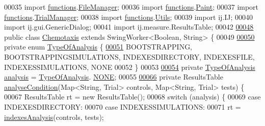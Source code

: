 \begin{DoxyCode}
00035 \textcolor{keyword}{import} \hyperlink{namespacefunctions}{functions}.\hyperlink{classfunctions_1_1_file_manager}{FileManager};
00036 \textcolor{keyword}{import} \hyperlink{namespacefunctions}{functions}.\hyperlink{classfunctions_1_1_paint}{Paint};
00037 \textcolor{keyword}{import} \hyperlink{namespacefunctions}{functions}.\hyperlink{classfunctions_1_1_trial_manager}{TrialManager};
00038 \textcolor{keyword}{import} \hyperlink{namespacefunctions}{functions}.\hyperlink{classfunctions_1_1_utils}{Utils};
00039 \textcolor{keyword}{import} ij.IJ;
00040 \textcolor{keyword}{import} ij.gui.GenericDialog;
00041 \textcolor{keyword}{import} ij.measure.ResultsTable;
00042 
\hypertarget{_chemotaxis_8java_source_l00048}{}\hyperlink{classanalysis_1_1_chemotaxis}{00048} \textcolor{keyword}{public} \textcolor{keyword}{class }\hyperlink{classanalysis_1_1_chemotaxis}{Chemotaxis} \textcolor{keyword}{extends} SwingWorker<Boolean, String> \{
00049 
\hypertarget{_chemotaxis_8java_source_l00050}{}\hyperlink{enumanalysis_1_1_chemotaxis_1_1_type_of_analysis}{00050}   \textcolor{keyword}{private} \textcolor{keyword}{enum} \hyperlink{enumanalysis_1_1_chemotaxis_1_1_type_of_analysis}{TypeOfAnalysis} \{
\hypertarget{_chemotaxis_8java_source_l00051}{}\hyperlink{enumanalysis_1_1_chemotaxis_1_1_type_of_analysis_a899caa602e4fff675b17cdbab33607ec}{00051}     BOOTSTRAPPING, BOOTSTRAPPINGSIMULATIONS, INDEXESDIRECTORY, INDEXESFILE, INDEXESSIMULATIONS, NONE
00052   \}
00053 
\hypertarget{_chemotaxis_8java_source_l00054}{}\hyperlink{classanalysis_1_1_chemotaxis_ae0c6f15cfb3c589fb7817738e51998bd}{00054}   \textcolor{keyword}{private} \hyperlink{enumanalysis_1_1_chemotaxis_1_1_type_of_analysis}{TypeOfAnalysis} \hyperlink{namespaceanalysis}{analysis} = \hyperlink{enumanalysis_1_1_chemotaxis_1_1_type_of_analysis}{TypeOfAnalysis}.
      \hyperlink{enumanalysis_1_1_chemotaxis_1_1_type_of_analysis_a899caa602e4fff675b17cdbab33607ec}{NONE};
00055 
\hypertarget{_chemotaxis_8java_source_l00066}{}\hyperlink{classanalysis_1_1_chemotaxis_aaa89eb018d311df9e98b904088d282a5}{00066}   \textcolor{keyword}{private} ResultsTable \hyperlink{classanalysis_1_1_chemotaxis_aaa89eb018d311df9e98b904088d282a5}{analyseCondition}(Map<String, Trial> controls, Map<String, Trial> 
      tests) \{
00067     ResultsTable rt = \textcolor{keyword}{new} ResultsTable();
00068     \textcolor{keywordflow}{switch} (analysis) \{
00069       \textcolor{keywordflow}{case} INDEXESDIRECTORY:
00070       \textcolor{keywordflow}{case} INDEXESSIMULATIONS:
00071         rt = \hyperlink{classanalysis_1_1_chemotaxis_ae0431b7311aa1bb593e062536734de2c}{indexesAnalysis}(controls, tests);

\end{DoxyCode}

